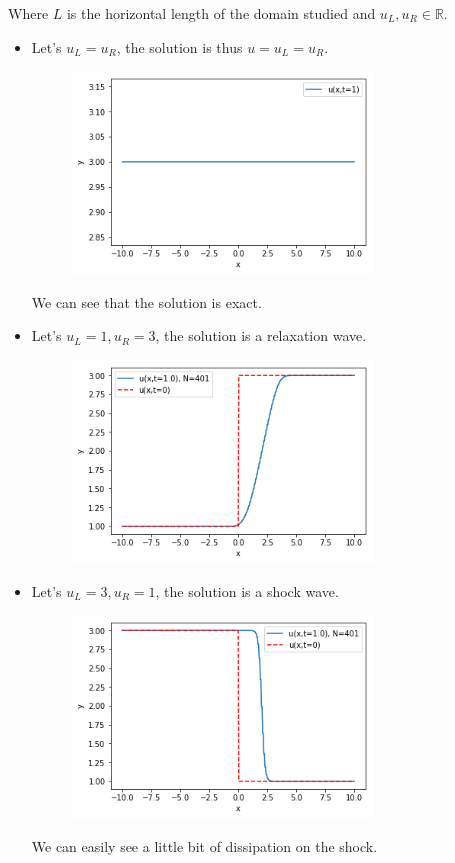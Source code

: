         Where $L$ is the horizontal length of the domain studied and $u_L,u_R\in \mathds{R}$.
        \begin{itemize}
            \item Let's $u_L=u_R$, the solution is thus $u=u_L=u_R$.
                \begin{figure}[H]
                    \centering
                    \includegraphics[width= 8cm]{Burgers/Burgers331.png}
                    \label{fig:my_label33}
                \end{figure}
                We can see that the solution is exact.
            \item Let's $u_L=1, u_R = 3$, the solution is a relaxation wave.
                \begin{figure}[H]
                    \centering
                    \includegraphics[width= 8cm]{Burgers/Burgers13.png}
                    \label{fig:my_label13}
                \end{figure}
                
            \item Let's $u_L=3,u_R=1$, the solution is a shock wave.
                \begin{figure}[H]
                    \centering
                    \includegraphics[width= 8cm]{Burgers/Burgers31.png}
                    \label{fig:my_label31}
                \end{figure}
                We can easily see a little bit of dissipation on the shock.
        \end{itemize}
        
